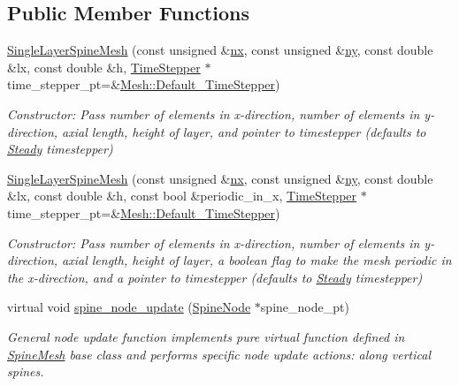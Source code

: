 \subsection*{Public Member Functions}
\begin{DoxyCompactItemize}
\item 
\hyperlink{classoomph_1_1SingleLayerSpineMesh_a2cdbf36114a4da773fb7d659218d09cb}{Single\+Layer\+Spine\+Mesh} (const unsigned \&\hyperlink{classoomph_1_1RectangularQuadMesh_abfef93d6322886cdce14a437186e4821}{nx}, const unsigned \&\hyperlink{classoomph_1_1RectangularQuadMesh_a86d76a55eb7c4e8bca9b74d23c8b0412}{ny}, const double \&lx, const double \&h, \hyperlink{classoomph_1_1TimeStepper}{Time\+Stepper} $\ast$time\+\_\+stepper\+\_\+pt=\&\hyperlink{classoomph_1_1Mesh_a12243d0fee2b1fcee729ee5a4777ea10}{Mesh\+::\+Default\+\_\+\+Time\+Stepper})
\begin{DoxyCompactList}\small\item\em Constructor\+: Pass number of elements in x-\/direction, number of elements in y-\/direction, axial length, height of layer, and pointer to timestepper (defaults to \hyperlink{classoomph_1_1Steady}{Steady} timestepper) \end{DoxyCompactList}\item 
\hyperlink{classoomph_1_1SingleLayerSpineMesh_afb908e31d988eaa930e949a54eeea37f}{Single\+Layer\+Spine\+Mesh} (const unsigned \&\hyperlink{classoomph_1_1RectangularQuadMesh_abfef93d6322886cdce14a437186e4821}{nx}, const unsigned \&\hyperlink{classoomph_1_1RectangularQuadMesh_a86d76a55eb7c4e8bca9b74d23c8b0412}{ny}, const double \&lx, const double \&h, const bool \&periodic\+\_\+in\+\_\+x, \hyperlink{classoomph_1_1TimeStepper}{Time\+Stepper} $\ast$time\+\_\+stepper\+\_\+pt=\&\hyperlink{classoomph_1_1Mesh_a12243d0fee2b1fcee729ee5a4777ea10}{Mesh\+::\+Default\+\_\+\+Time\+Stepper})
\begin{DoxyCompactList}\small\item\em Constructor\+: Pass number of elements in x-\/direction, number of elements in y-\/direction, axial length, height of layer, a boolean flag to make the mesh periodic in the x-\/direction, and a pointer to timestepper (defaults to \hyperlink{classoomph_1_1Steady}{Steady} timestepper) \end{DoxyCompactList}\item 
virtual void \hyperlink{classoomph_1_1SingleLayerSpineMesh_a364648c15ab29c0c8d1cf7c2bc4cb792}{spine\+\_\+node\+\_\+update} (\hyperlink{classoomph_1_1SpineNode}{Spine\+Node} $\ast$spine\+\_\+node\+\_\+pt)
\begin{DoxyCompactList}\small\item\em General node update function implements pure virtual function defined in \hyperlink{classoomph_1_1SpineMesh}{Spine\+Mesh} base class and performs specific node update actions\+: along vertical spines. \end{DoxyCompactList}\end{DoxyCompactItemize}
